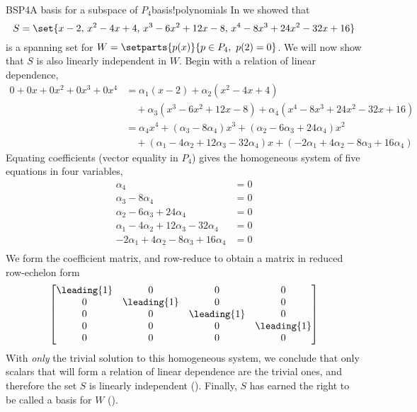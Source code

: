 \begin{example}{BSP4}{A basis for a subspace of $P_4$}{basis!polynomials}
In  we showed that
%
\begin{equation*}
S=\set{x-2,\,x^2-4x+4,\,x^3-6x^2+12x-8,\,x^4-8x^3+24x^2-32x+16}
\end{equation*}
%
is a spanning set for $W=\setparts{p(x)}{p\in P_4,\ p(2)=0}$.  We will now show that $S$ is also linearly independent in $W$.  Begin with a relation of linear dependence,
%
\begin{align*}
0+0x+0x^2+0x^3+0x^4
&=\alpha_1\left(x-2\right)+\alpha_2\left(x^2-4x+4\right)\\
&\quad +\alpha_3\left(x^3-6x^2+12x-8\right)+\alpha_4\left(x^4-8x^3+24x^2-32x+16\right)\\
%
&=\alpha_4x^4+
\left(\alpha_3-8\alpha_4\right)x^3+
\left(\alpha_2-6\alpha_3+24\alpha_4\right)x^2\\
&\quad +
\left(\alpha_1-4\alpha_2+12\alpha_3-32\alpha_4\right)x+
\left(-2\alpha_1+4\alpha_2-8\alpha_3+16\alpha_4\right)
\end{align*}
%
Equating coefficients (vector equality in $P_4$) gives the homogeneous system of five equations in four variables,
%
\begin{align*}
\alpha_4&=0\\
\alpha_3-8\alpha_4&=0\\
\alpha_2-6\alpha_3+24\alpha_4&=0\\
\alpha_1-4\alpha_2+12\alpha_3-32\alpha_4&=0\\
-2\alpha_1+4\alpha_2-8\alpha_3+16\alpha_4&=0\\
\end{align*}
%
We form the coefficient matrix, and row-reduce to obtain a matrix in reduced row-echelon form
%
\begin{equation*}
\begin{bmatrix}
\leading{1}&0&0&0\\
0&\leading{1}&0&0\\
0&0&\leading{1}&0\\
0&0&0&\leading{1}\\
0&0&0&0
\end{bmatrix}
\end{equation*}
%
With {\em only} the trivial solution to this homogeneous system, we conclude that only scalars that will form a relation of linear dependence are the trivial ones, and therefore the set $S$ is linearly independent ().  Finally, $S$ has earned the right to be called a basis for $W$ ().
\end{example}
